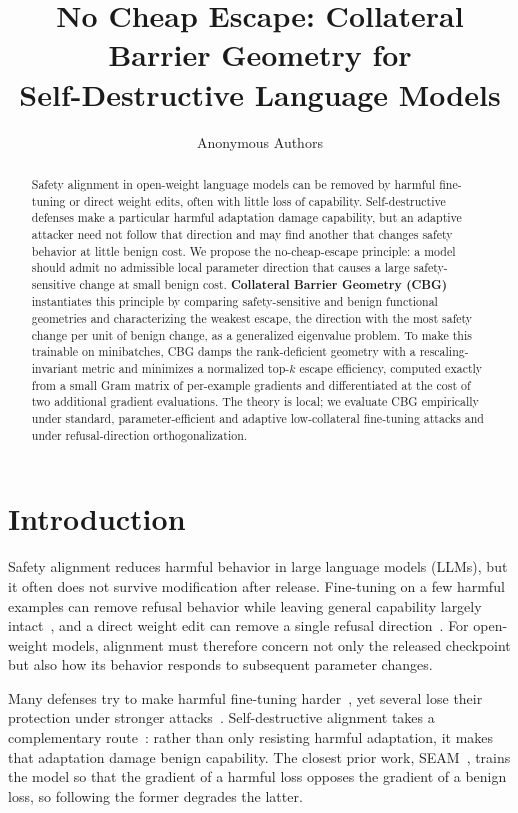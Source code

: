 \documentclass[11pt]{article}
\title{\textbf{No Cheap Escape: Collateral Barrier Geometry for\\Self-Destructive Language Models}}
\author{Anonymous Authors}
\date{}
\begin{document}
\maketitle

\begin{abstract}
Safety alignment in open-weight language models can be removed by harmful fine-tuning or direct weight edits, often with little loss of capability. Self-destructive defenses make a particular harmful adaptation damage capability, but an adaptive attacker need not follow that direction and may find another that changes safety behavior at little benign cost. We propose the no-cheap-escape principle: a model should admit no admissible local parameter direction that causes a large safety-sensitive change at small benign cost. \textbf{Collateral Barrier Geometry (CBG)} instantiates this principle by comparing safety-sensitive and benign functional geometries and characterizing the weakest escape, the direction with the most safety change per unit of benign change, as a generalized eigenvalue problem. To make this trainable on minibatches, CBG damps the rank-deficient geometry with a rescaling-invariant metric and minimizes a normalized top-$k$ escape efficiency, computed exactly from a small Gram matrix of per-example gradients and differentiated at the cost of two additional gradient evaluations. The theory is local; we evaluate CBG empirically under standard, parameter-efficient and adaptive low-collateral fine-tuning attacks and under refusal-direction orthogonalization.
\end{abstract}



\section{Introduction}
\label{sec:introduction}

Safety alignment reduces harmful behavior in large language models (LLMs), but it often does not survive modification after release. Fine-tuning on a few harmful examples can remove refusal behavior while leaving general capability largely intact~\citep{qi2024finetuning}, and a direct weight edit can remove a single refusal direction~\citep{arditi2024refusal}. For open-weight models, alignment must therefore concern not only the released checkpoint but also how its behavior responds to subsequent parameter changes.

Many defenses try to make harmful fine-tuning harder~\citep{huang2024vaccine,huang2025booster,rosati2024repnoise,tamirisa2025tar}, yet several lose their protection under stronger attacks~\citep{qi2025evaluating}. Self-destructive alignment takes a complementary route~\citep{henderson2023self}: rather than only resisting harmful adaptation, it makes that adaptation damage benign capability. The closest prior work, SEAM~\citep{wang2026seam}, trains the model so that the gradient of a harmful loss opposes the gradient of a benign loss, so following the former degrades the latter.
\end{document}
